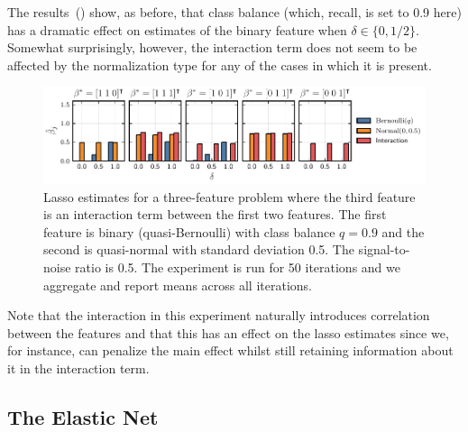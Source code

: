 The results~() show, as before, that class balance (which, recall,
is set to 0.9 here) has a dramatic effect on estimates of the binary feature when \(\delta
\in \{0, 1/2\}\). Somewhat surprisingly, however, the interaction term does not seem to be
affected by the normalization type for any of the cases in which it is present.

\begin{figure}[htpb]
  \label{fig:interactions}
  \centering
  \includegraphics[]{plots/interactions.pdf}
  \caption{%
    Lasso estimates for a three-feature problem where the third feature is an interaction term between the first two features. The first feature is binary (quasi-Bernoulli) with class balance \(q=0.9\) and the second is quasi-normal with standard deviation 0.5. The signal-to-noise ratio is 0.5. The experiment is run for 50 iterations and we aggregate and report means across all iterations.
  }
\end{figure}

Note that the interaction in this experiment naturally introduces correlation between the
features and that this has an effect on the lasso estimates since we, for instance, can
penalize the main effect whilst still retaining information about it in the interaction
term.

\subsection{The Elastic Net}\label{sec:experiments-elasticnet}

